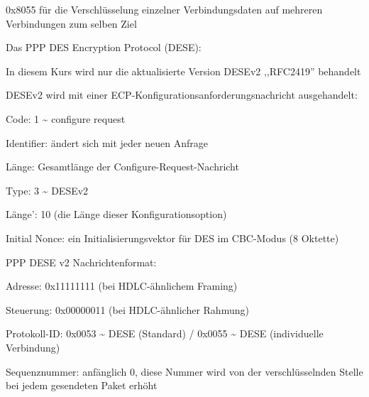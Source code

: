 \documentclass[a4paper]{article}
\begin{document}
\begin{multicols}{3}
\begin{itemize*}
\begin{itemize*}
\begin{itemize*}
\begin{itemize*}
                              \item 0x8055 für die Verschlüsselung einzelner Verbindungsdaten auf mehreren Verbindungen zum selben Ziel
                        \end{itemize*}
                  \end{itemize*}
            \end{itemize*}
            \item Das PPP DES Encryption Protocol (DESE):
            \begin{itemize*}
                  \item In diesem Kurs wird nur die aktualisierte Version DESEv2 ,,RFC2419'' behandelt
                  \item DESEv2 wird mit einer ECP-Konfigurationsanforderungsnachricht ausgehandelt:
                  \begin{itemize*}
                        \item Code: 1 \textasciitilde{} configure request
                        \item Identifier: ändert sich mit jeder neuen Anfrage
                        \item Länge: Gesamtlänge der Configure-Request-Nachricht
                        \item Type: 3 \textasciitilde{} DESEv2
                        \item Länge': 10 (die Länge dieser Konfigurationsoption)
                        \item Initial Nonce: ein Initialisierungsvektor für DES im CBC-Modus (8 Oktette)
                  \end{itemize*}
            \end{itemize*}
            \item PPP DESE v2 Nachrichtenformat:
            \begin{itemize*}
                  \item Adresse: 0x11111111 (bei HDLC-ähnlichem Framing)
                  \item Steuerung: 0x00000011 (bei HDLC-ähnlicher Rahmung)
                  \item Protokoll-ID: 0x0053 \textasciitilde{} DESE (Standard) / 0x0055 \textasciitilde{} DESE (individuelle Verbindung)
                  \item Sequenznummer: anfänglich 0, diese Nummer wird von der verschlüsselnden Stelle bei jedem gesendeten Paket erhöht

\end{itemize*}
\end{itemize*}
\end{multicols}
\end{document}

